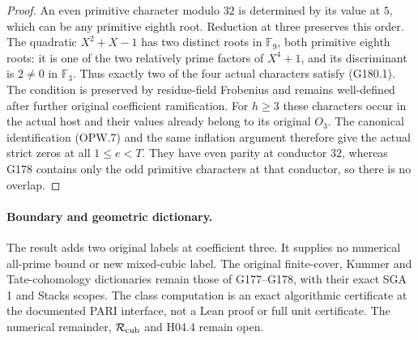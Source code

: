 \begin{proof}
An even primitive character modulo $32$ is determined by its
value at $5$, which can be any primitive eighth root.
Reduction at three preserves this order.
The quadratic $X^2+X-1$ has two distinct roots in $\mathbb F_9$,
both primitive eighth roots: it is one of the two relatively prime
factors of $X^4+1$, and its discriminant is $2\ne0$ in $\mathbb F_3$.
Thus exactly two of the four actual characters satisfy (G180.1).
The condition is preserved by residue-field Frobenius and remains
well-defined after further original coefficient ramification.
For $h\geq3$ these characters occur in the actual host and their
values already belong to its original $O_3$.
The canonical identification (OPW.7) and the same inflation argument
therefore give the actual strict zeros at all $1\leq e<T$.
They have even parity at conductor $32$, whereas G178 contains
only the odd primitive characters at that conductor, so there
is no overlap.
\end{proof}

\paragraph{Boundary and geometric dictionary.}
The result adds two original labels at coefficient three.
It supplies no numerical all-prime bound or new mixed-cubic label.
The original finite-cover, Kummer and Tate-cohomology dictionaries
remain those of G177--G178, with their exact SGA 1 and Stacks scopes.
The class computation is an exact algorithmic certificate at the
documented PARI interface, not a Lean proof or full unit certificate.
The numerical remainder, $\mathcal R_{\rm cub}$ and H04.4 remain open.
